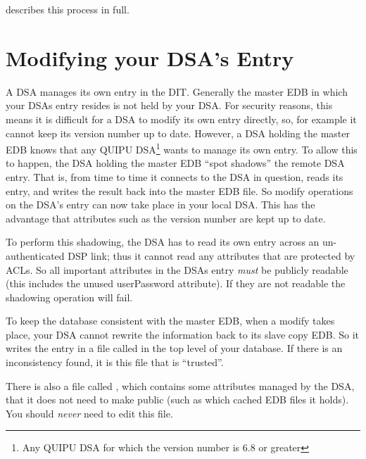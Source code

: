 \cite{QUIPU.Design} describes this process in full.


\section {Modifying your DSA's Entry}
\label{DSA:ownentry}

A DSA manages its own entry in the DIT.
Generally the master EDB in
which your DSAs entry resides is not held by your DSA.  
For security reasons, this means it is
difficult for a DSA to modify its own entry directly, so, for example it cannot
keep its version number  up to date.
However, a  DSA holding the
master EDB knows that any QUIPU DSA\footnote{Any 
QUIPU DSA for which the version number is 6.8 or greater}
wants to manage its own entry.
To allow this to happen, the DSA holding the master EDB 
``spot shadows''
the remote DSA entry.  That is, from
time to time it connects to the DSA in question, reads its entry,
and writes the result back into the master EDB file.  
So modify
operations on the DSA's entry can now take place in your local DSA.  This 
has the advantage that attributes such as the version number are
kept up to date.

To perform this shadowing, the DSA has to read its own entry across an
un-authenticated DSP link; thus it cannot read any attributes that
are protected by ACLs.  
So all important attributes in the DSAs entry {\em must} be publicly
readable (this includes the unused userPassword attribute).
If they are not readable the shadowing operation will fail.

To keep the database consistent with the master EDB, when a modify 
takes place, your DSA
cannot rewrite the information back to its slave copy EDB.
So it writes the entry in a file called
in the top
level of your database.  If there is an inconsistency found, it is
this file that is ``trusted''.

There is also a file called , which
contains some attributes managed by the DSA, that it does not need to
make public (such as which cached EDB files it holds).
You should {\em never} need to edit this file.

